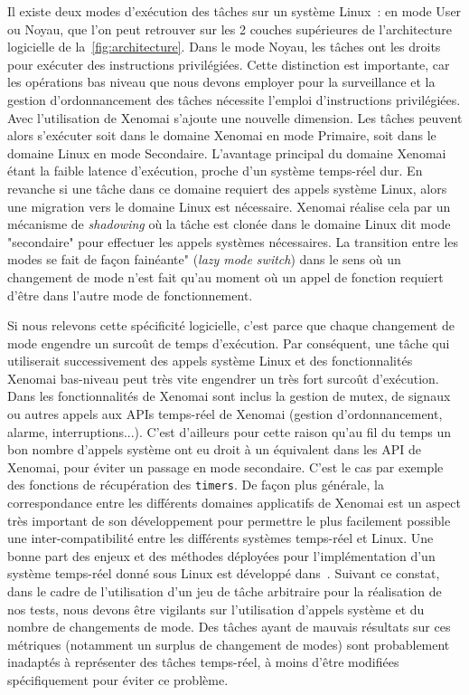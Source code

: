 \documentclass[french, a4paper, 11pt, twoside, pdftex]{StyleThese}
\begin{document}
		Il existe deux modes d'exécution des tâches sur un système Linux~:  en mode User ou Noyau, que l'on peut retrouver sur les 2 couches supérieures de l'architecture logicielle de la~\autoref{fig:architecture}. Dans le mode Noyau, les tâches ont les droits pour exécuter des instructions privilégiées. Cette distinction est importante, car les opérations bas niveau que nous devons employer pour la surveillance et la gestion d'ordonnancement des tâches nécessite l'emploi d'instructions privilégiées. Avec l'utilisation de Xenomai s'ajoute une nouvelle dimension. Les tâches peuvent alors s'exécuter soit dans le domaine Xenomai en mode Primaire, soit dans le domaine Linux en mode Secondaire. L'avantage principal du domaine Xenomai étant la faible latence d'exécution, proche d'un système temps-réel dur. En revanche si une tâche dans ce domaine requiert des appels système Linux, alors une migration vers le domaine Linux est nécessaire. Xenomai réalise cela par un mécanisme de \textit{shadowing} où la tâche est clonée dans le domaine Linux dit mode "secondaire" pour effectuer les appels systèmes nécessaires. La transition entre les modes se fait de façon fainéante" (\textit{lazy mode switch}) dans le sens où  un changement de mode n'est fait qu'au moment où un appel de fonction requiert d'être dans l'autre mode de fonctionnement. 
		
		Si nous relevons cette spécificité logicielle, c'est parce que chaque changement de mode engendre un surcoût de temps d'exécution. Par conséquent, une tâche qui utiliserait successivement des appels système Linux et des fonctionnalités Xenomai bas-niveau peut très vite engendrer un très fort surcoût d'exécution. Dans les fonctionnalités de Xenomai sont inclus la gestion de mutex, de signaux ou autres appels aux APIs temps-réel de Xenomai (gestion d'ordonnancement, alarme, interruptions...). C'est d'ailleurs pour cette raison qu'au fil du temps un bon nombre d'appels système ont eu droit à un équivalent dans les API de Xenomai, pour éviter un passage en mode secondaire. C'est le cas par exemple des fonctions de récupération des \texttt{timers}. De façon plus générale, la correspondance entre les différents domaines applicatifs de Xenomai est un aspect très important de son développement pour permettre le plus facilement possible une inter-compatibilité entre les différents systèmes temps-réel et Linux. Une bonne part des enjeux et des méthodes déployées pour l'implémentation d'un système temps-réel donné sous Linux est développé dans~\cite{gerum_xenomai_2015}. 
	    Suivant ce constat, dans le cadre de l'utilisation d'un jeu de tâche arbitraire pour la réalisation de nos tests, nous devons être vigilants sur l'utilisation d'appels système et du nombre de changements de mode. Des tâches ayant de mauvais résultats sur ces métriques (notamment un surplus de changement de modes) sont probablement inadaptés à représenter des tâches temps-réel, à moins d'être modifiées spécifiquement pour éviter ce problème. 
\end{document}
